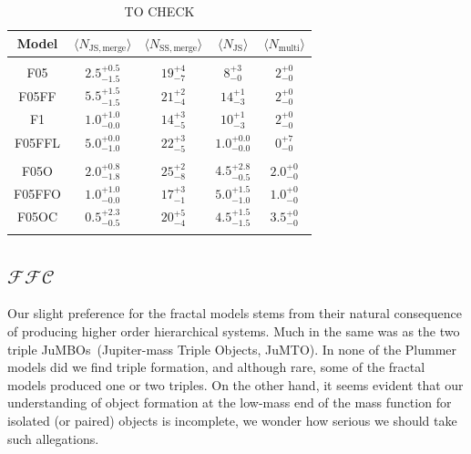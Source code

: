 \documentclass[submission,phys]{lib/SciPost}
\newcommand{\jumbos}{\mbox{JuMBOs}}
\begin{document}
    \begin{table}
         \caption{TO CHECK}
        \label{Tab:M2Events} 
        \centering 
        \begin{tabular}{c c c c c}
        \hline\hline
        Model & $\langle N_{\mathrm{JS, merge}}\rangle$ & $\langle N_{\mathrm{SS, merge}}\rangle$ & $\langle N_{\mathrm{JS}}\rangle$ &  $\langle N_{\mathrm{multi}} \rangle$ \\
        \hline \vspace{-0.75em}\\ 
           F05     & $2.5^{+0.5}_{-1.5}$ & $19^{+4}_{-7}$ & $8^{+3}_{-0}$  & $2^{+0}_{-0}$ \vspace{0.25em}\\
           F05FF   & $5.5^{+1.5}_{-1.5}$ & $21^{+2}_{-4}$ & $14^{+1}_{-3}$ & $2^{+0}_{-0}$ \vspace{0.25em}\\
           F1      & $1.0^{+1.0}_{-0.0}$ & $14^{+3}_{-5}$ & $10^{+1}_{-3}$ & $2^{+0}_{-0}$ \vspace{0.25em}\\
           F05FFL  & $5.0^{+0.0}_{-1.0}$ & $22^{+3}_{-5}$ & $1.0^{+0.0}_{-0.0}$ & $0^{+7}_{-0}$ \vspace{0.25em}\\
           \hline \vspace{-0.75em}\\
           F05O    & $2.0^{+0.8}_{-1.8}$ & $25^{+2}_{-8}$ & $4.5^{+2.8}_{-0.5}$ & $2.0^{+0}_{-0}$ \vspace{0.25em}\\
           F05FFO  & $1.0^{+1.0}_{-0.0}$ & $17^{+3}_{-1}$ & $5.0^{+1.5}_{-1.0}$ & $1.0^{+0}_{-0}$ \vspace{0.25em}\\
           F05OC   & $0.5^{+2.3}_{-0.5}$ & $20^{+5}_{-4}$ & $4.5^{+1.5}_{-1.5}$ & $3.5^{+0}_{-0}$ \vspace{0.25em}\\
           \hline
         \hline                               %
         \label{Tab:Systems}
        \end{tabular}
     \end{table}
    \subsection{$\mathcal{FFC}$}

Our slight preference for the fractal models stems from their natural
consequence of producing higher order hierarchical systems. Much in
the same was as the two triple \jumbos\, (Jupiter-mass Triple Objects,
JuMTO). In none of the Plummer models did we find triple formation,
and although rare, some of the fractal models produced one or two
triples. On the other hand, it seems evident that our understanding of
object formation at the low-mass end of the mass function for isolated
(or paired) objects is incomplete, we wonder how serious we should
take such allegations.
\end{document}
